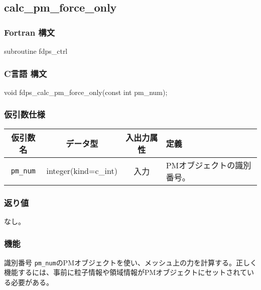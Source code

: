 \subsection{calc\_pm\_force\_only}
\subsubsection*{Fortran 構文}
\begin{screen}
\begin{spverbatim}
subroutine fdps_ctrl%
\end{spverbatim}
\end{screen}

\subsubsection*{C言語 構文}
\begin{screen}
\begin{spverbatim}
void fdps_calc_pm_force_only(const int pm_num);
\end{spverbatim}
\end{screen}

\subsubsection*{仮引数仕様}
\begin{table}[h]
\begin{tabularx}{\linewidth}{cccX}
\toprule
\rowcolor{Snow2}
仮引数名 & データ型 & 入出力属性 & 定義 \\
\midrule
\texttt{pm\_num} & integer(kind=c\_int) & 入力 & PMオブジェクトの識別番号。\\
\bottomrule
\end{tabularx}
\end{table}


\subsubsection*{返り値}
なし。

\subsubsection*{機能}
識別番号 \texttt{pm\_num}のPMオブジェクトを使い、メッシュ上の力を計算する。正しく機能するには、事前に粒子情報や領域情報がPMオブジェクトにセットされている必要がある。
\clearpage

